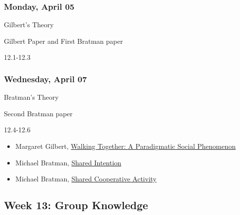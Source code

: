 \documentclass[
]{article}
\providecommand{\tightlist}{%
  \setlength{\itemsep}{0pt}\setlength{\parskip}{0pt}}
\begin{document}
\begin{multicols}{2}

\hypertarget{monday-april-05}{%
\subsubsection{Monday, April 05}\label{monday-april-05}}

\begin{description}
\tightlist
\item[Topic]
Gilbert's Theory
\item[Reading]
Gilbert Paper and First Bratman paper
\item[Lectures]
12.1-12.3
\end{description}

\hypertarget{wednesday-april-07}{%
\subsubsection{Wednesday, April 07}\label{wednesday-april-07}}

\begin{description}
\tightlist
\item[Topic]
Bratman's Theory
\item[Reading]
Second Bratman paper
\item[Lectures]
12.4-12.6
\end{description}

\end{multicols}

\begin{itemize}
\tightlist
\item
  Margaret Gilbert, \href{https://philpapers.org/rec/GILWTA}{Walking
  Together: A Paradigmatic Social Phenomenon}
\item
  Michael Bratman, \href{https://philpapers.org/rec/BRASI}{Shared
  Intention}
\item
  Michael Bratman, \href{https://philpapers.org/rec/BRASCA}{Shared
  Cooperative Activity}
\end{itemize}

\hypertarget{week-13-group-knowledge}{%
\subsection{Week 13: Group Knowledge}\label{week-13-group-knowledge}}
\end{document}
